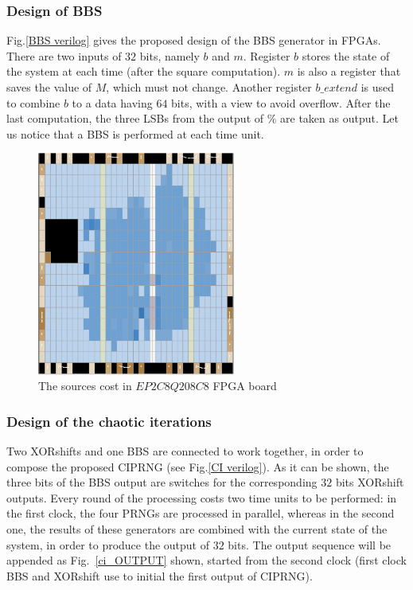 \subsubsection{Design of BBS}
Fig.\ref{BBS verilog} gives the proposed design of the BBS generator in FPGAs.
There are two inputs of $32$ bits, namely 
$b$ and $m$. 
Register $b$ stores the state of the system
at each time (after the square computation). 
$m$ is also a register that saves the value of $M$, which must not change.
Another register $b\_extend$ 
is used to combine $b$ to a data having $64$ bits, with a view to avoid overflow. 
After the last computation,
the three LSBs from the output of $\%$ are
taken as output. 
Let us notice that a BBS is
 performed at each time unit.

\begin{figure}
\begin{center}
  \includegraphics[width=6.5cm]{print.eps}
\end{center}
\caption{The sources cost in $EP2C8Q208C8$ FPGA board}
 \label{logic elements}
\end{figure}

\subsubsection{Design of the chaotic iterations}
Two XORshifts and one BBS are connected to work together, in order to compose the
proposed CIPRNG (see Fig.\ref{CI verilog}). 
As it can be shown, the three bits of the BBS output are switches for the corresponding $32$ bits XORshift outputs. Every round of the 
 processing costs two time units
 to be performed: in the first clock, 
the four PRNGs are processed in parallel,
whereas in the second one, the results of these generators are combined with 
the current state of the system, in order to produce the output of $32$ bits. The output sequence will be appended as Fig.~\ref{ci_OUTPUT} shown, started from the second clock (first clock BBS and XORshift use to initial the first output of CIPRNG).

